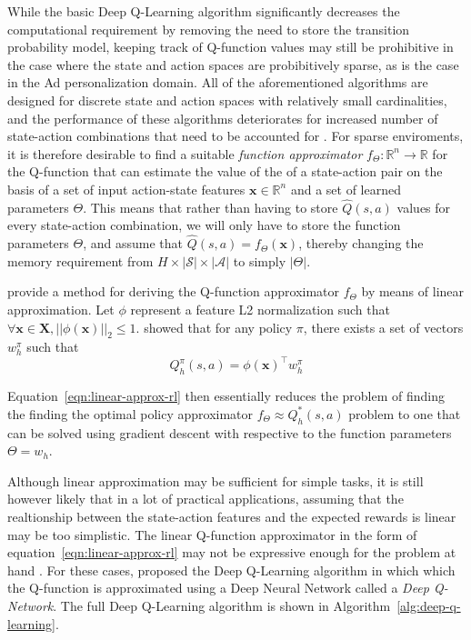 \documentclass{mldsmsc}
\begin{document}
While the basic Deep Q-Learning algorithm significantly decreases the computational requirement
by removing the need to store the transition probability model, keeping track of Q-function values
may still be prohibitive in the case where the state and action spaces are probibitively sparse,
as is the case in the Ad personalization domain. All of the aforementioned algorithms are designed
for discrete state and action spaces with relatively small cardinalities, and the performance of these
algorithms deteriorates for increased number of state-action combinations that need to be accounted for \citep{pike-burke2024LearnigAgents}.
For sparse enviroments, it is therefore desirable to find a suitable \emph{function approximator} $f_{\Theta}: \mathbb{R}^n \rightarrow \mathbb{R}$ for the
Q-function that can estimate the value of the of a state-action pair on the basis of a set of input
action-state features $\mathbf{x} \in \mathbb{R}^n$ and a set of learned parameters $\Theta$. This
means that rather than having to store $\hat{Q}(s,a)$ values for every state-action combination,
we will only have to store the function parameters $\Theta$, and assume that $\hat{Q}(s,a) = f_{\Theta}(\mathbf{x})$,
thereby changing the memory requirement from $H \times |\mathcal{S}| \times |\mathcal{A}|$ to simply
$|\Theta|$.

\cite{RefWorks:jin2020provably} provide a method for deriving the Q-function approximator
$f_{\Theta}$ by means of linear approximation. Let $\phi$ represent a feature L2 normalization 
such that $\forall \mathbf{x} \in \mathbf{X}, ||\phi(\mathbf{x})||_2 \leq 1$. \cite{RefWorks:jin2020provably}
showed that for any policy $\pi$, there exists a set of vectors $w_h^{\pi}$ such that
\begin{equation}\label{eqn:linear-approx-rl}
    Q_h^{\pi}(s,a) = \phi(\mathbf{x})^{\intercal} w_h^{\pi}
\end{equation}

Equation~\ref{eqn:linear-approx-rl} then essentially reduces the problem of finding the
finding the optimal policy approximator $f_{\Theta} \approx Q_h^*(s,a)$ problem to one
that can be solved using gradient descent with respective to the function parameters
$\Theta = w_h$.

Although linear approximation may be sufficient for simple tasks, it is still however
likely that in a lot of practical applications, assuming that the realtionship between
the state-action features and the expected rewards is linear may be too simplistic. The
linear Q-function approximator in the form of equation~\ref{eqn:linear-approx-rl} may not
be expressive enough for the problem at hand \citep{pike-burke2024LearnigAgents}. For these
cases, \cite{RefWorks:mnih2015human-level} proposed the Deep Q-Learning algorithm in which
which the Q-function is approximated using a Deep Neural Network called a \emph{Deep Q-Network}.
The full Deep Q-Learning algorithm is shown in Algorithm~\ref{alg:deep-q-learning}.
\end{document}
